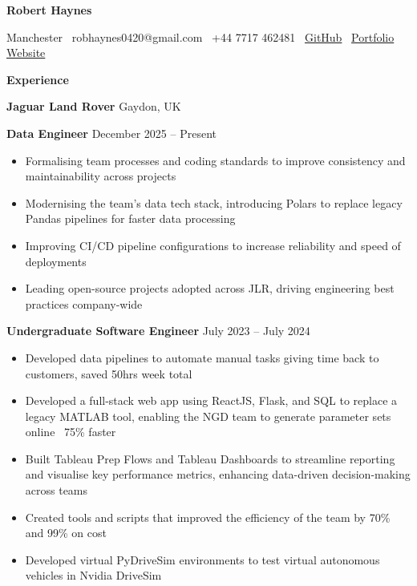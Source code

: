 \documentclass[11pt]{article}
\begin{document}
\begin{center}
    \textbf{Robert Haynes}\\ 
    \hrulefill
\end{center}

\begin{center}
    Manchester \textbullet \ robhaynes0420@gmail.com \textbullet \ +44 7717 462481 \textbullet \ \href{https://github.com/robbiehaynes}{GitHub} \textbullet \ \href{https://www.haynoway.com}{Portfolio Website}
\end{center}

\vspace{0.5pt}

\begin{center}
    \textbf{Experience}
\end{center}
\textbf{Jaguar Land Rover} \hfill Gaydon, UK

\textbf{Data Engineer} \hfill December 2025 – Present
\begin{itemize}[noitemsep, topsep=0pt, partopsep=0pt, parsep=0pt]
    \item Formalising team processes and coding standards to improve consistency and maintainability across projects
    \item Modernising the team's data tech stack, introducing Polars to replace legacy Pandas pipelines for faster data processing
    \item Improving CI/CD pipeline configurations to increase reliability and speed of deployments
    \item Leading open-source projects adopted across JLR, driving engineering best practices company-wide
\end{itemize}

\vspace{1pt}

\textbf{Undergraduate Software Engineer} \hfill July 2023 – July 2024
\begin{itemize}[noitemsep, topsep=0pt, partopsep=0pt, parsep=0pt]
    \item Developed data pipelines to automate manual tasks giving time back to customers, saved 50hrs week total
    \item Developed a full-stack web app using ReactJS, Flask, and SQL to replace a legacy MATLAB tool, enabling the NGD team to generate parameter sets online ~75\% faster
    \item Built Tableau Prep Flows and Tableau Dashboards to streamline reporting and visualise key performance metrics, enhancing data-driven decision-making across teams
    \item Created tools and scripts that improved the efficiency of the team by 70\% and 99\% on cost
    \item Developed virtual PyDriveSim environments to test virtual autonomous vehicles in Nvidia DriveSim
\end{itemize}
\end{document}
